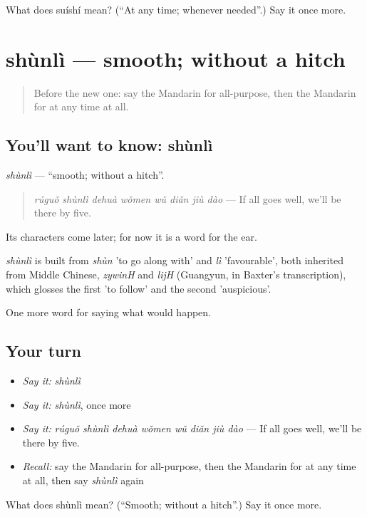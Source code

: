 \begin{tcolorbox}[breakable,colback=teal!4,colframe=teal!35!black,title={Before you move on}]
What does suíshí mean? (\textquotedblleft{}At any time; whenever needed\textquotedblright{}.) Say it once more.
\end{tcolorbox}
\section[shùnlì]{shùnlì — smooth; without a hitch}

\label{lesson:ZH-C393-shunli}



\begin{quote}
Before the new one: say the Mandarin for all-purpose, then the Mandarin for at any time at all.
\end{quote}

\subsection*{You'll want to know: shùnlì}
\emph{shùnlì} — \textquotedblleft{}smooth; without a hitch\textquotedblright{}.

\begin{quote}
\emph{rúguǒ shùnlì dehuà wǒmen wǔ diǎn jiù dào} — If all goes well, we'll be there by five.
\end{quote}

Its characters come later; for now it is a word for the ear.

\begin{cousinweb}
\emph{shùnlì} is built from \emph{shùn} 'to go along with' and \emph{lì} 'favourable', both inherited from Middle Chinese, \emph{zywinH} and \emph{lijH} (Guangyun, in Baxter's transcription), which glosses the first 'to follow' and the second 'auspicious'.
\end{cousinweb}

\begin{grammarlens}[title={What you've built}]
One more word for saying what would happen.
\end{grammarlens}

\subsection*{Your turn}
\begin{itemize}
\raggedright
  \item \emph{Say it:} \emph{shùnlì}
  \item \emph{Say it:} \emph{shùnlì}, once more
  \item \emph{Say it:} \emph{rúguǒ shùnlì dehuà wǒmen wǔ diǎn jiù dào} — If all goes well, we'll be there by five.
  \item \emph{Recall:} say the Mandarin for all-purpose, then the Mandarin for at any time at all, then say \emph{shùnlì} again
\end{itemize}

\begin{tcolorbox}[breakable,colback=teal!4,colframe=teal!35!black,title={Before you move on}]
What does shùnlì mean? (\textquotedblleft{}Smooth; without a hitch\textquotedblright{}.) Say it once more.
\end{tcolorbox}
